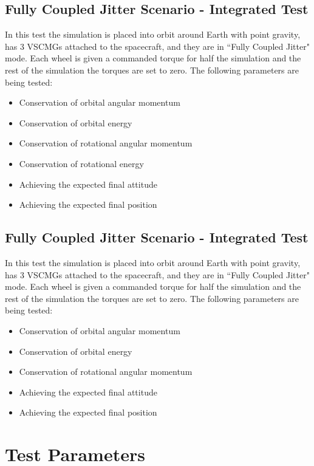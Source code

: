\subsection{Fully Coupled Jitter Scenario - Integrated Test}
In this test the simulation is placed into orbit around Earth with point gravity, has 3 VSCMGs attached to the spacecraft, and they are in ``Fully Coupled Jitter" mode. Each wheel is given a commanded torque for half the simulation and the rest of the simulation the torques are set to zero. The following parameters are being tested:
\begin{itemize}
\item Conservation of orbital angular momentum
\item Conservation of orbital energy
\item Conservation of rotational angular momentum
\item Conservation of rotational energy
\item Achieving the expected final attitude
\item Achieving the expected final position
\end{itemize}

\subsection{Fully Coupled Jitter Scenario - Integrated Test}
In this test the simulation is placed into orbit around Earth with point gravity, has 3 VSCMGs attached to the spacecraft, and they are in ``Fully Coupled Jitter" mode. Each wheel is given a commanded torque for half the simulation and the rest of the simulation the torques are set to zero. The following parameters are being tested:
\begin{itemize}
\item Conservation of orbital angular momentum
\item Conservation of orbital energy
\item Conservation of rotational angular momentum
\item Achieving the expected final attitude
\item Achieving the expected final position
\end{itemize}

\section{Test Parameters}

